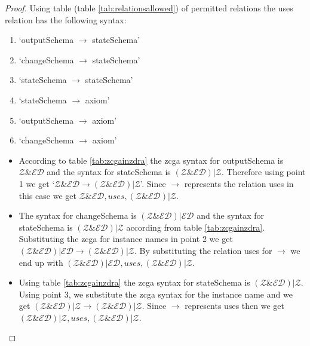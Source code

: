 \begin{proof}
Using table (table \ref{tab:relationsallowed}) of permitted relations the uses relation has the following syntax:
\begin{enumerate}
\item `outputSchema $\longrightarrow$ stateSchema'
\item `changeSchema $\longrightarrow$ stateSchema'
\item `stateSchema $\longrightarrow$ stateSchema'
\item `stateSchema $\longrightarrow$ axiom'
\item `outputSchema $\longrightarrow$ axiom'
\item `changeSchema $\longrightarrow$ axiom'
\end{enumerate} 

\begin{itemize}
\item According to table \ref{tab:zcgainzdra} the \gls{zcga} syntax for outputSchema is $\mathcal{Z}\&\mathcal{ED}$ and the syntax for stateSchema is $(\mathcal{Z} \& \mathcal{ED}) | \mathcal{Z}$. Therefore using point 1 we get `$\mathcal{Z}\&\mathcal{ED} \longrightarrow (\mathcal{Z} \& \mathcal{ED}) | \mathcal{Z}$'. Since $\longrightarrow$ represents the relation uses in this case we get $\mathcal{Z} \& \mathcal{ED}, uses, (\mathcal{Z} \& \mathcal{ED}) | \mathcal{Z}$.

\item The syntax for changeSchema is $(\mathcal{Z} \& \mathcal{ED}) | \mathcal{ED}$ and the syntax for stateSchema is $(\mathcal{Z} \& \mathcal{ED}) | \mathcal{Z}$ according from table \ref{tab:zcgainzdra}. Substituting the \gls{zcga} for instance names in point 2 we get $(\mathcal{Z} \& \mathcal{ED}) | \mathcal{ED} \longrightarrow (\mathcal{Z} \& \mathcal{ED}) | \mathcal{Z}$. By substituting the relation uses for $\longrightarrow$ we end up with $(\mathcal{Z} \& \mathcal{ED}) | \mathcal{ED}, uses, (\mathcal{Z} \& \mathcal{ED}) | \mathcal{Z}$.

\item Using table \ref{tab:zcgainzdra} the \gls{zcga} syntax for stateSchema is $(\mathcal{Z} \& \mathcal{ED}) | \mathcal{Z}$. Using point 3, we substitute the \gls{zcga} syntax for the instance name and we get $(\mathcal{Z} \& \mathcal{ED}) | \mathcal{Z} \longrightarrow (\mathcal{Z} \& \mathcal{ED}) | \mathcal{Z}$. Since $\longrightarrow$ represents uses then we get $(\mathcal{Z} \& \mathcal{ED}) | \mathcal{Z}, uses, (\mathcal{Z} \& \mathcal{ED}) | \mathcal{Z}$.


\end{itemize}
\end{proof}
